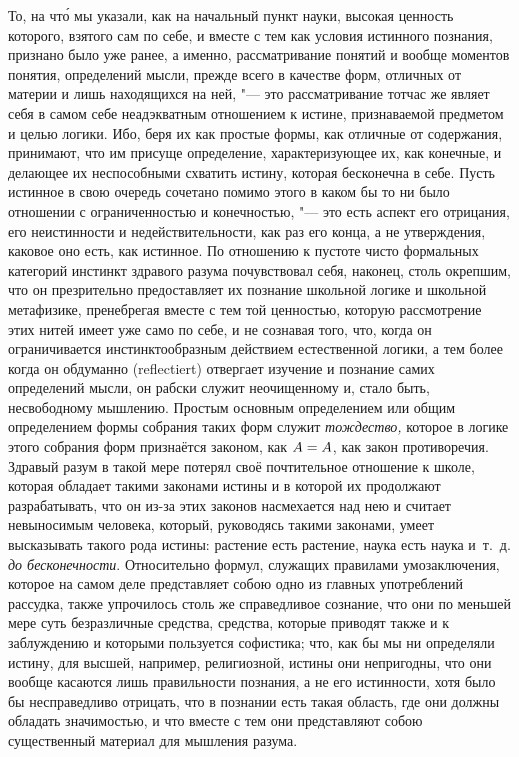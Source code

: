 То, на чт\'{о} мы указали, как на начальный пункт науки, высокая ценность
которого, взятого сам по себе, и вместе с тем как условия истинного познания,
признано было уже ранее, а именно, рассматривание понятий и вообще моментов
понятия, определений мысли, прежде всего в качестве форм, отличных от материи и
лишь находящихся на ней, "--- это рассматривание тотчас же являет себя в самом
себе неадэкватным отношением к истине, признаваемой предметом и целью логики.
Ибо, беря их как простые формы, как отличные от содержания, принимают, что им
присуще определение, характеризующее их, как конечные, и делающее их
неспособными схватить истину, которая бесконечна в себе. Пусть истинное в свою
очередь сочетано помимо этого в каком бы то ни было отношении с ограниченностью
и конечностью, "--- это есть аспект его отрицания, его неистинности и
недействительности, как раз его конца, а не утверждения, каковое оно есть, как
истинное. По отношению к пустоте чисто формальных категорий инстинкт здравого
разума почувствовал себя, наконец, столь окрепшим, что он презрительно
предоставляет их познание школьной логике и школьной метафизике, пренебрегая
вместе с тем той ценностью, которую рассмотрение этих нитей имеет уже само по
себе, и не сознавая того, что, когда он ограничивается инстинктообразным
действием естественной логики, а тем более когда он обдуманно (reflectiert)
отвергает изучение и познание самих определений мысли, он рабски служит
неочищенному и, стало быть, несвободному мышлению. Простым основным
определением или общим определением формы собрания таких форм служит
{\em тождество,} которое в логике этого собрания форм признаётся законом, как
$A\hm=A$, как закон противоречия. Здравый разум в такой мере потерял своё
почтительное отношение к школе, которая обладает такими законами истины и в
которой их продолжают разрабатывать, что он из-за этих законов насмехается над
нею и считает невыносимым человека, который, руководясь такими законами, умеет
высказывать такого рода истины: растение есть растение, наука есть наука
и~т.~д. {\em до бесконечности}. Относительно формул, служащих правилами
умозаключения, которое на самом деле представляет собою одно из главных
употреблений рассудка, также упрочилось столь же справедливое сознание, что они
по меньшей мере суть безразличные средства, средства, которые приводят также и
к заблуждению и которыми пользуется софистика; что, как бы мы ни определяли
истину, для высшей, например, религиозной, истины они непригодны, что они
вообще касаются лишь правильности познания, а не его истинности, хотя было бы
несправедливо отрицать, что в познании есть такая область, где они должны
обладать значимостью, и что вместе с тем они представляют собою существенный
материал для мышления разума.


